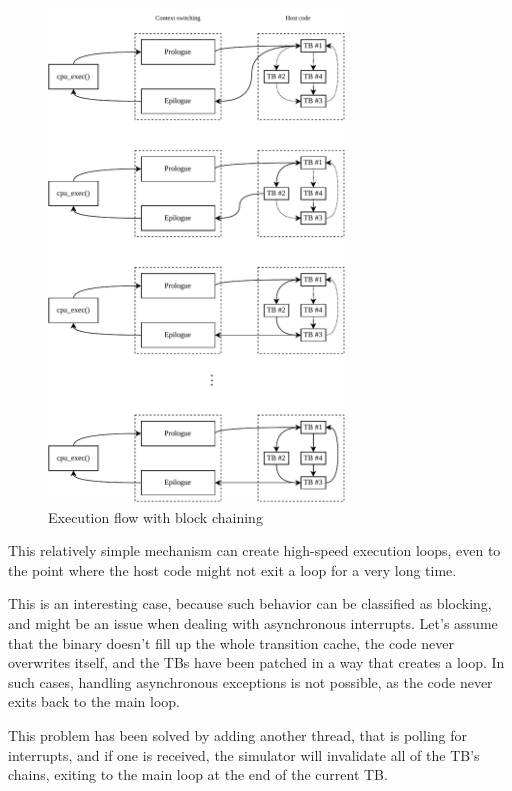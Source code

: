 \begin{figure}[h]
	\centering
	\includegraphics[width=0.7\textwidth]{figures/TbExecution-Chain.pdf}
	\caption{Execution flow with block chaining}
\end{figure}

\noindent
This relatively simple mechanism can create high-speed execution loops, even to the point where the host code
might not exit a loop for a very long time.

This is an interesting case, because such behavior can be classified as
blocking, and might be an issue when dealing with asynchronous interrupts. Let's assume that the binary doesn't fill up
the whole transition cache, the code never overwrites itself, and the TBs have been patched in a way that creates a
loop. In such cases, handling asynchronous exceptions is not possible, as the code never exits back to the main loop.

This problem has been solved by adding another thread, that is polling for interrupts, and if one is received, the
simulator will invalidate all of the TB's chains, exiting to the main loop at the end of the current TB.

